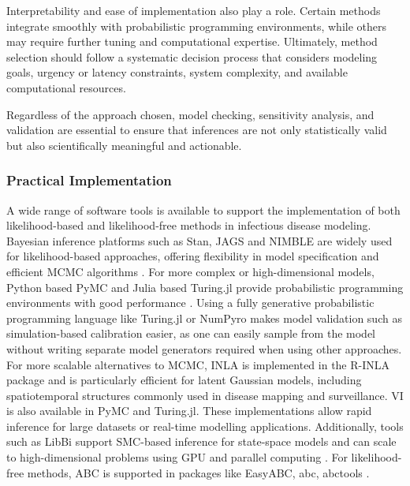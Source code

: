 \documentclass{article}
\begin{document}
Interpretability and ease of implementation also play a role. Certain methods integrate smoothly with probabilistic programming environments, while others may require further tuning and computational expertise. Ultimately, method selection should follow a systematic decision process that considers modeling goals, urgency or latency constraints, system complexity, and available computational resources. 

Regardless of the approach chosen, model checking, sensitivity analysis, and validation are essential to ensure that inferences are not only statistically valid but also scientifically meaningful and actionable.

\subsubsection{Practical Implementation}

A wide range of software tools is available to support the implementation of both likelihood-based and likelihood-free methods in infectious disease modeling. Bayesian inference platforms such as Stan, JAGS and NIMBLE are widely used for likelihood-based approaches, offering flexibility in model specification and efficient MCMC algorithms \citep{carpenter2017stan,abril2023pymc}. For more complex or high-dimensional models, Python based PyMC and Julia based Turing.jl provide probabilistic programming environments with good performance \citep{abril2023pymc,ge2018turing,fjelde2025turing}. Using a fully generative probabilistic programming language like Turing.jl or NumPyro makes model validation such as simulation-based calibration easier, as one can easily sample from the model without writing separate model generators required when using other approaches. For more scalable alternatives to MCMC, INLA is implemented in the R-INLA package \citep{martins2013bayesian} and is particularly efficient for latent Gaussian models, including spatiotemporal structures commonly used in disease mapping and surveillance. VI is also available in PyMC and Turing.jl. These implementations allow rapid inference for large datasets or real-time modelling applications.  Additionally, tools such as LibBi support SMC-based inference for state-space models and can scale to high-dimensional problems using GPU and parallel computing \citep{murray2015bayesian}. For likelihood-free methods, ABC is supported in packages like EasyABC, abc, abctools \citep{jabot2013easy,csillery2012abc,nunes2015abctools}.
\end{document}

